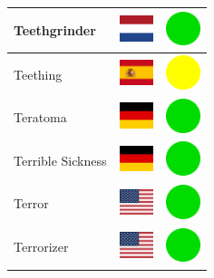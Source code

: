 \documentclass[12pt, a4paper, twoside]{report}
\begin{document}
\begin{center}
\begin{longtable}{|p{5cm}|p{2cm}|p{2cm}|}
 Teethgrinder                                               & \includegraphics[width=1cm]{../4x3/nl} &   \includegraphics[width=1cm]{../likes/y} \\ \hline
 Teething                                                   & \includegraphics[width=1cm]{../4x3/es} &   \includegraphics[width=1cm]{../likes/m} \\ \hline
 Teratoma                                                   & \includegraphics[width=1cm]{../4x3/de} &   \includegraphics[width=1cm]{../likes/y} \\ \hline
 Terrible Sickness                                          & \includegraphics[width=1cm]{../4x3/de} &   \includegraphics[width=1cm]{../likes/y} \\ \hline
 Terror                                                     & \includegraphics[width=1cm]{../4x3/us} &   \includegraphics[width=1cm]{../likes/y} \\ \hline
 Terrorizer                                                 & \includegraphics[width=1cm]{../4x3/us} &   \includegraphics[width=1cm]{../likes/y} \\ \hline

\end{longtable}
\end{center}
\end{document}
